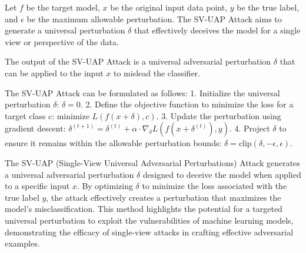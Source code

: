 Let \( f \) be the target model, \( x \) be the original input data point, \( y \) be the true label, and \( \epsilon \) be the maximum allowable perturbation. The SV-UAP Attack aims to generate a universal perturbation \( \delta \) that effectively deceives the model for a single view or perspective of the data.

The output of the SV-UAP Attack is a universal adversarial perturbation \( \delta \) that can be applied to the input \( x \) to mislead the classifier.

The SV-UAP Attack can be formulated as follows:
1. Initialize the universal perturbation \( \delta \):
   $
   \delta = 0.
   $
2. Define the objective function to minimize the loss for a target class \( c \):
   $
   \text{minimize } L(f(x + \delta), c).
   $
3. Update the perturbation using gradient descent:
   $
   \delta^{(t+1)} = \delta^{(t)} + \alpha \cdot \nabla_{\delta} L(f(x + \delta^{(t)}), y).
   $
4. Project \( \delta \) to ensure it remains within the allowable perturbation bounds:
   $
   \delta = \text{clip}(\delta, -\epsilon, \epsilon).
   $

The SV-UAP (Single-View Universal Adversarial Perturbations) Attack generates a universal adversarial perturbation \( \delta \) designed to deceive the model when applied to a specific input \( x \). By optimizing \( \delta \) to minimize the loss associated with the true label \( y \), the attack effectively creates a perturbation that maximizes the model's misclassification. This method highlights the potential for a targeted universal perturbation to exploit the vulnerabilities of machine learning models, demonstrating the efficacy of single-view attacks in crafting effective adversarial examples.
